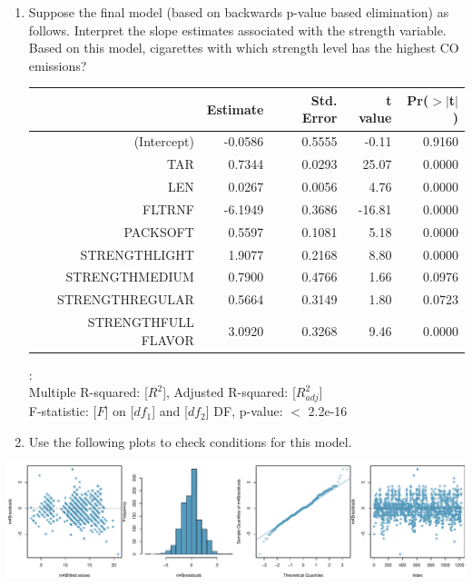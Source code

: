 \documentclass[11pt]{article}
\begin{document}
\begin{enumerate}
\item Suppose the final model (based on backwards p-value based elimination) as follows. Interpret the slope estimates associated with the strength variable. Based on this model, cigarettes with which strength level has the highest CO emissions?

{\small
\begin{center}
\begin{tabular}{rrrrr}
  \hline
 & Estimate & Std. Error & t value & Pr($>$$|$t$|$) \\ 
  \hline
(Intercept) & -0.0586 & 0.5555 & -0.11 & 0.9160 \\ 
  TAR & 0.7344 & 0.0293 & 25.07 & 0.0000 \\ 
  LEN & 0.0267 & 0.0056 & 4.76 & 0.0000 \\ 
  FLTRNF & -6.1949 & 0.3686 & -16.81 & 0.0000 \\ 
  PACKSOFT & 0.5597 & 0.1081 & 5.18 & 0.0000 \\ 
  STRENGTHLIGHT & 1.9077 & 0.2168 & 8.80 & 0.0000 \\ 
  STRENGTHMEDIUM & 0.7900 & 0.4766 & 1.66 & 0.0976 \\ 
  STRENGTHREGULAR & 0.5664 & 0.3149 & 1.80 & 0.0723 \\ 
  STRENGTHFULL FLAVOR & 3.0920 & 0.3268 & 9.46 & 0.0000 \\ 
   \hline
\end{tabular}
$:$ \\
Multiple R-squared:  \textcolor{oiB}{[$R^2$]},	Adjusted R-squared:  \textcolor{oiB}{[$R^2_{adj}$]} \\
F-statistic: \textcolor{oiB}{[$F$]} on \textcolor{oiB}{[$df_1$]} and \textcolor{oiB}{[$df_2$]} DF,  p-value: $<$ 2.2e-16
\end{center}
}

\item Use the following plots to check conditions for this model.

\end{enumerate}

\begin{center}
\includegraphics[width=\textwidth]{diag.pdf}
\end{center}
\end{document}
